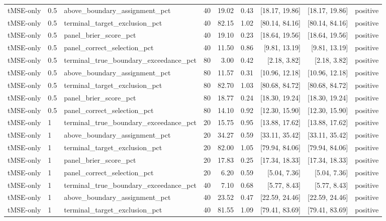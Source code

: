 \begin{longtable}{lllrrrrrl}
tMSE-only & 0.5 & above\_boundary\_assignment\_pct & 40 & 19.02 & 0.43 & [18.17, 19.86] & [18.17, 19.86] & positive \\
tMSE-only & 0.5 & terminal\_target\_exclusion\_pct & 40 & 82.15 & 1.02 & [80.14, 84.16] & [80.14, 84.16] & positive \\
tMSE-only & 0.5 & panel\_brier\_score\_pct & 40 & 19.10 & 0.23 & [18.64, 19.56] & [18.64, 19.56] & positive \\
tMSE-only & 0.5 & panel\_correct\_selection\_pct & 40 & 11.50 & 0.86 & [9.81, 13.19] & [9.81, 13.19] & positive \\
tMSE-only & 0.5 & terminal\_true\_boundary\_exceedance\_pct & 80 & 3.00 & 0.42 & [2.18, 3.82] & [2.18, 3.82] & positive \\
tMSE-only & 0.5 & above\_boundary\_assignment\_pct & 80 & 11.57 & 0.31 & [10.96, 12.18] & [10.96, 12.18] & positive \\
tMSE-only & 0.5 & terminal\_target\_exclusion\_pct & 80 & 82.70 & 1.03 & [80.68, 84.72] & [80.68, 84.72] & positive \\
tMSE-only & 0.5 & panel\_brier\_score\_pct & 80 & 18.77 & 0.24 & [18.30, 19.24] & [18.30, 19.24] & positive \\
tMSE-only & 0.5 & panel\_correct\_selection\_pct & 80 & 14.10 & 0.92 & [12.30, 15.90] & [12.30, 15.90] & positive \\
tMSE-only & 1 & terminal\_true\_boundary\_exceedance\_pct & 20 & 15.75 & 0.95 & [13.88, 17.62] & [13.88, 17.62] & positive \\
tMSE-only & 1 & above\_boundary\_assignment\_pct & 20 & 34.27 & 0.59 & [33.11, 35.42] & [33.11, 35.42] & positive \\
tMSE-only & 1 & terminal\_target\_exclusion\_pct & 20 & 82.00 & 1.05 & [79.94, 84.06] & [79.94, 84.06] & positive \\
tMSE-only & 1 & panel\_brier\_score\_pct & 20 & 17.83 & 0.25 & [17.34, 18.33] & [17.34, 18.33] & positive \\
tMSE-only & 1 & panel\_correct\_selection\_pct & 20 & 6.20 & 0.59 & [5.04, 7.36] & [5.04, 7.36] & positive \\
tMSE-only & 1 & terminal\_true\_boundary\_exceedance\_pct & 40 & 7.10 & 0.68 & [5.77, 8.43] & [5.77, 8.43] & positive \\
tMSE-only & 1 & above\_boundary\_assignment\_pct & 40 & 23.52 & 0.47 & [22.59, 24.46] & [22.59, 24.46] & positive \\
tMSE-only & 1 & terminal\_target\_exclusion\_pct & 40 & 81.55 & 1.09 & [79.41, 83.69] & [79.41, 83.69] & positive \\

\end{longtable}
